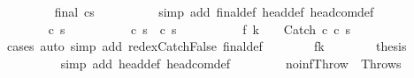 \begin{isabellebody}
\ \ \ \ \ \ \isamarkupfalse%
\ {\isachardoublequoteopen}{\isasymnot}\ final\ {\isacharparenleft}c{\isacharprime}{\isacharcomma}s{\isacharprime}{\isacharparenright}{\isachardoublequoteclose}\isanewline
\ \ \ \ \ \ \ \ \isamarkupfalse%
\ {\isacharparenleft}simp\ add{\isacharcolon}\ final{\isacharunderscore}def\ head{\isacharunderscore}def\ head{\isacharunderscore}com{\isacharunderscore}def{\isacharparenright}\isanewline
\ \ \ \ \ \ \isamarkupfalse%
\isanewline
\ \ \ \ \ \ \isamarkupfalse%
\ c{\isacharprime}{\isacharprime}\ s{\isacharprime}{\isacharprime}\ \isanewline
\ \ \ \ \ \ \ \ \ {\isachardoublequoteopen}{\isasymGamma}{\isasymturnstile}{\isacharparenleft}c{\isacharprime}{\isacharcomma}\ s{\isacharprime}{\isacharparenright}\ {\isasymrightarrow}\ {\isacharparenleft}c{\isacharprime}{\isacharprime}{\isacharcomma}\ s{\isacharprime}{\isacharprime}{\isacharparenright}{\isachardoublequoteclose}\ \isanewline
\ \ \ \ \ \ \ \ \ {\isachardoublequoteopen}f\ {\isacharparenleft}k\ {\isacharplus}\ {}{\isacharparenright}\ {\isacharequal}\ {\isacharparenleft}Catch\ c{\isacharprime}{\isacharprime}\ c\ s{\isacharprime}{\isacharprime}{\isacharparenright}{\isachardoublequoteclose}\isanewline
\ \ \ \ \ \ \ \ \isamarkupfalse%
\ cases\ {\isacharparenleft}auto\ simp\ add{\isacharcolon}\ redex{\isacharunderscore}Catch{\isacharunderscore}False\ final{\isacharunderscore}def{\isacharparenright}{\isacharplus}\isanewline
\ \ \ \ \ \ \isamarkupfalse%
\ f{\isacharunderscore}k\isanewline
\ \ \ \ \ \ \isamarkupfalse%
\ {\isacharquery}thesis\isanewline
\ \ \ \ \ \ \ \ \isamarkupfalse%
\ {\isacharparenleft}simp\ add{\isacharcolon}\ head{\isacharunderscore}def\ head{\isacharunderscore}com{\isacharunderscore}def{\isacharparenright}\isanewline
\ \ \ \ \isamarkupfalse%
\isanewline
\ \ \isamarkupfalse%
\isanewline
{}\isamarkupfalse%
%
\endisatagproof
{\isafoldproof}%
%
\isadelimproof
\isanewline
%
\endisadelimproof
\isanewline
{}\isamarkupfalse%
\ no{\isacharunderscore}inf{\isacharunderscore}Throw{\isacharcolon}\ {\isachardoublequoteopen}{\isasymnot}\ {\isasymGamma}{\isasymturnstile}{\isacharparenleft}Throw{\isacharcomma}s{\isacharparenright}\ {\isasymrightarrow}\ {\isasymdots}{\isacharparenleft}{\isasyminfinity}{\isacharparenright}{\isachardoublequoteclose}\isanewline
%
\isadelimproof
%
\endisadelimproof
%
\isatagproof

\end{isabellebody}
